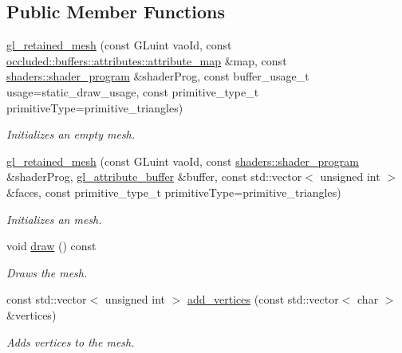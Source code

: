 \subsection*{Public Member Functions}
\begin{DoxyCompactItemize}
\item 
\hyperlink{classoccluded_1_1opengl_1_1retained_1_1gl__retained__mesh_a64b7a4795fc93fc81308e1a464debd24}{gl\+\_\+retained\+\_\+mesh} (const G\+Luint vao\+Id, const \hyperlink{classoccluded_1_1buffers_1_1attributes_1_1attribute__map}{occluded\+::buffers\+::attributes\+::attribute\+\_\+map} \&map, const \hyperlink{classoccluded_1_1opengl_1_1retained_1_1shaders_1_1shader__program}{shaders\+::shader\+\_\+program} \&shader\+Prog, const buffer\+\_\+usage\+\_\+t usage=static\+\_\+draw\+\_\+usage, const primitive\+\_\+type\+\_\+t primitive\+Type=primitive\+\_\+triangles)
\begin{DoxyCompactList}\small\item\em Initializes an empty mesh. \end{DoxyCompactList}\item 
\hyperlink{classoccluded_1_1opengl_1_1retained_1_1gl__retained__mesh_ac7b08ac856c790d12581f8ce27be96bf}{gl\+\_\+retained\+\_\+mesh} (const G\+Luint vao\+Id, const \hyperlink{classoccluded_1_1opengl_1_1retained_1_1shaders_1_1shader__program}{shaders\+::shader\+\_\+program} \&shader\+Prog, \hyperlink{classoccluded_1_1opengl_1_1retained_1_1gl__attribute__buffer}{gl\+\_\+attribute\+\_\+buffer} \&buffer, const std\+::vector$<$ unsigned int $>$ \&faces, const primitive\+\_\+type\+\_\+t primitive\+Type=primitive\+\_\+triangles)
\begin{DoxyCompactList}\small\item\em Initializes an mesh. \end{DoxyCompactList}\item 
void \hyperlink{classoccluded_1_1opengl_1_1retained_1_1gl__retained__mesh_aa2018120d3a1dcca990e85a24efe20fb}{draw} () const 
\begin{DoxyCompactList}\small\item\em Draws the mesh. \end{DoxyCompactList}\item 
const std\+::vector$<$ unsigned int $>$ \hyperlink{classoccluded_1_1opengl_1_1retained_1_1gl__retained__mesh_af1df11c76aefccc2bd9b67f839bfcbb8}{add\+\_\+vertices} (const std\+::vector$<$ char $>$ \&vertices)
\begin{DoxyCompactList}\small\item\em Adds vertices to the mesh. \end{DoxyCompactList}\item 

\end{DoxyCompactItemize}
